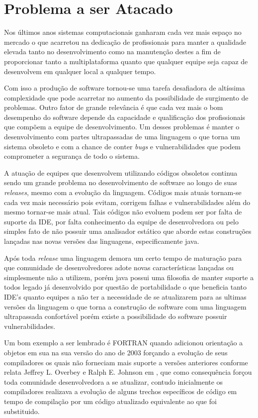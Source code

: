 \section{Problema a ser Atacado}

Nos últimos anos sistemas computacionais ganharam cada vez mais espaço no mercado o que acarretou na dedicação de profissionais para manter a qualidade elevada tanto no desenvolvimento como na manutenção destes a fim de proporcionar tanto a multiplataforma quanto que qualquer equipe seja capaz de desenvolvem em qualquer local a qualquer tempo.

Com isso a produção de software tornou-se uma tarefa desafiadora de altíssima complexidade que pode acarretar no aumento da possibilidade de surgimento de problemas. Outro fator de grande relevância é que cada vez mais o bom desempenho do software depende da capacidade e qualificação dos profissionais que compõem a equipe de desenvolvimento. Um desses problemas é manter o desenvolvimento com partes ultrapassadas de uma linguagem o que torna um sistema obsoleto e com a chance de conter {\it bugs} e vulnerabilidades que podem comprometer a segurança de todo o sistema.


A atuação de equipes que desenvolvem utilizando códigos obsoletos continua sendo um grande problema no desenvolvimento de software ao longo de suas \textit{releases}, mesmo com a evolução da linguagem. Códigos mais atuais tornam-se cada vez mais necessário pois evitam, corrigem falhas e vulnerabilidades além do mesmo tornar-se mais atual. Tais códigos não evoluem podem ser por falta de suporte da IDE, por falta conhecimento da equipe de desenvolvedora ou pelo simples fato de não possuir uma analisador estático que aborde estas construções lançadas nas novas versões das linguagens, especificamente java.


Após toda \textit{release} uma linguagem demora um certo tempo de maturação para que comunidade de desenvolvedores adote novas características lançadas ou simplesmente não a utilizem, porém java possui uma filosofia de manter suporte a todos legado já desenvolvido por questão de portabilidade o que beneficia tanto IDE's quanto equipes a não ter a necessidade de se atualizarem para as ultimas versões da linguagem o que torna a construção de software com uma linguagem ultrapassada confortável porém existe a possibilidade do software possuir vulnerabilidades.

Um bom exemplo a ser lembrado \'{e} FORTRAN quando adicionou orienta\c{c}\~{a}o a objetos em sua na sua vers\~{a}o do ano de 2003 for\c{c}ando a evolu\c{c}\~{a}o de seus compiladores os quais n\~{a}o forneciam mais suporte a vers\~{o}es anteriores conforme relata Jeffrey L. Overbey e Ralph E. Johnson em  \cite{Overbey:2009}, que como consequ\^{e}ncia forçou toda comunidade desenvolvedora a se atualizar, contudo inicialmente os compiladores realizava a evolu\c{c}\~{a}o de alguns trechos espec\'{i}ficos de c\'{o}digo em tempo de compila\c{c}\~{a}o por um c\'{o}digo atualizado equivalente ao que foi substituido.

